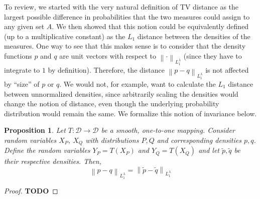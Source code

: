 \documentclass[12pt]{article}
\newcommand*{\norm}[1]{\left\lVert#1\right\rVert}
\newtheorem{prop}{Proposition}
\begin{document}
To review, we started with the very natural definition of TV distance as the largest possible difference in probabilities that the two measures could assign to any given set $A$. We then showed that this notion could be equivalently defined (up to a multiplicative constant) as the $L_1$ distance between the densities of the measures. One way to see that this makes sense is to consider that the density functions $p$ and $q$ are unit vectors with respect to $\norm{\cdot}_{L_1^\lambda}$ (since they have to integrate to $1$ by definition). Therefore, the distance 
$\norm{p - q}_{L_1^\lambda}$ is not affected by ``size'' of $p$ or $q$. We would not, for example, want to calculate the $L_1$ distance between unnormalized densities, since arbitrarily scaling the densities would change the notion of distance, even though the underlying probability distribution would remain the same. We formalize this notion of invariance below. 
\begin{prop}
Let $T: \mathcal{D} \to \mathcal{D}$ be a smooth, one-to-one mapping. Consider random variables $X_P$, $X_Q$ with distributions $P, Q$ and corresponding densities $p, q$. Define the random variables $Y_P = T(X_P)$ and $Y_Q = T(X_Q)$ and 
let $\tilde{p}, \tilde{q}$ be their respective densities. Then, 
\[\norm{p - q}_{L_1^{\lambda}} = \norm{\tilde{p} - \tilde{q}}_{L_1^{\lambda}}\]
\end{prop}

\begin{proof}
\textbf{TODO}
\end{proof}
\end{document}
